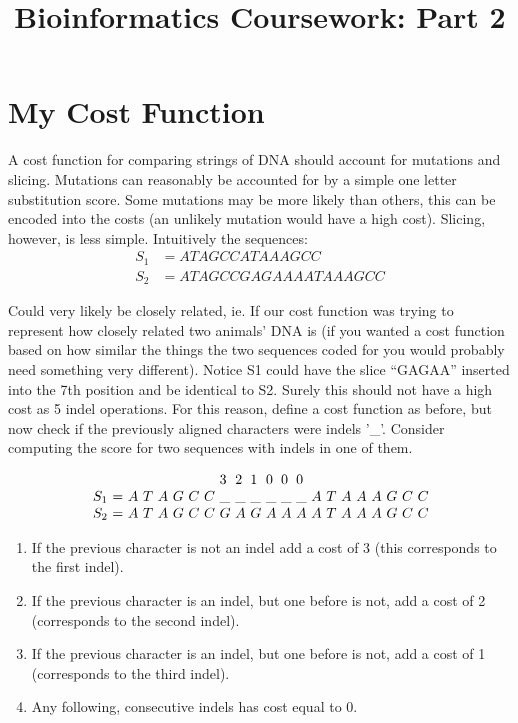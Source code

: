 \documentclass{mm2}
\title{Bioinformatics Coursework: Part 2}
\begin{document}
\section{My Cost Function}


A cost function for comparing strings of DNA should account for mutations and slicing. Mutations can reasonably be accounted for by a simple one letter substitution score. Some mutations may be more likely than others, this can be encoded into the costs (an unlikely mutation would have a high cost). Slicing, however, is less simple. Intuitively the sequences:
\begin{align}
	S_1 &= ATAGCCATAAAGCC\\
	S_2 &= ATAGCCGAGAAAATAAAGCC
\end{align}


Could very likely be closely related, ie. If our cost function was trying to represent how closely related two animals' DNA is (if you wanted a cost function based on how similar the things the two sequences coded for you would probably need something very different). Notice S1 could have the slice “GAGAA” inserted into the 7th position and be identical to S2. Surely this should not have a high cost as 5 indel operations. For this reason, define a cost function as before, but now check if the previously aligned characters were indels '\_'. Consider computing the score for two sequences with indels in one of them.


\[
  \begin{array}{*{22}{l@{\ }}}
        &   & & & & & & & 3& 2& 1& 0& 0& 0& & & & & & & &  \\
    S_1 & = &A&T&A&G&C&C&\_&\_&\_&\_&\_&\_&A&T&A&A&A&G&C&C \\
    S_2 & = &A&T&A&G&C&C& G& A& G& A& A& A&A&T&A&A&A&G&C&C
  \end{array}
\]

\begin{enumerate}
\item
If the previous character is not an indel add a cost of 3 (this corresponds to the first indel).
\item
If the previous character is an indel, but one before is not, add a cost of 2 (corresponds to the second indel).
\item
If the previous character is an indel, but one before is not, add a cost of 1 (corresponds to the third indel).
\item
Any following, consecutive indels has cost equal to 0.

\end{enumerate}
\end{document}
